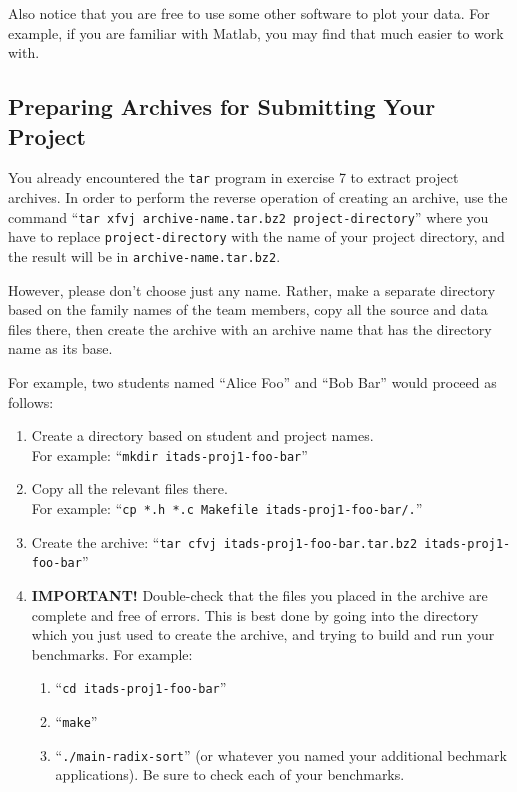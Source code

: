 \documentclass[a4paper,10pt]{article}
\begin{document}
Also notice that you are free to use some other software to plot your data.
For example, if you are familiar with Matlab, you may find that much easier to work with.



\subsection*{Preparing Archives for Submitting Your Project}

You already encountered the \texttt{tar} program in exercise 7 to extract project archives.
In order to perform the reverse operation of creating an archive, use the command ``\texttt{tar xfvj archive-name.tar.bz2 project-directory}'' where you have to replace \texttt{project-directory} with the name of your project directory, and the result will be in \texttt{archive-name.tar.bz2}.

However, please don't choose just any name.
Rather, make a separate directory based on the family names of the team members, copy all the source and data files there, then create the archive with an archive name that has the directory name as its base.

For example, two students named ``Alice Foo'' and ``Bob Bar'' would proceed as follows:
\begin{enumerate}
\item
  Create a directory based on student and project names.\\
  For example: ``\texttt{mkdir itads-proj1-foo-bar}''
\item
  Copy all the relevant files there.\\
  For example: ``\texttt{cp *.h *.c Makefile itads-proj1-foo-bar/.}''
\item
  Create the archive: ``\texttt{tar cfvj itads-proj1-foo-bar.tar.bz2 itads-proj1-foo-bar}''
\item
  \textbf{IMPORTANT!}
  Double-check that the files you placed in the archive are complete and free of errors.
  This is best done by going into the directory which you just used to create the archive, and trying to build and run your benchmarks.
  For example:
  \begin{enumerate}
  \item
    ``\texttt{cd itads-proj1-foo-bar}''
  \item
    ``\texttt{make}''
  \item
    ``\texttt{./main-radix-sort}'' (or whatever you named your additional bechmark applications).
    Be sure to check each of your benchmarks.
  \end{enumerate}
\end{enumerate}



\footnotesize


\end{document}
